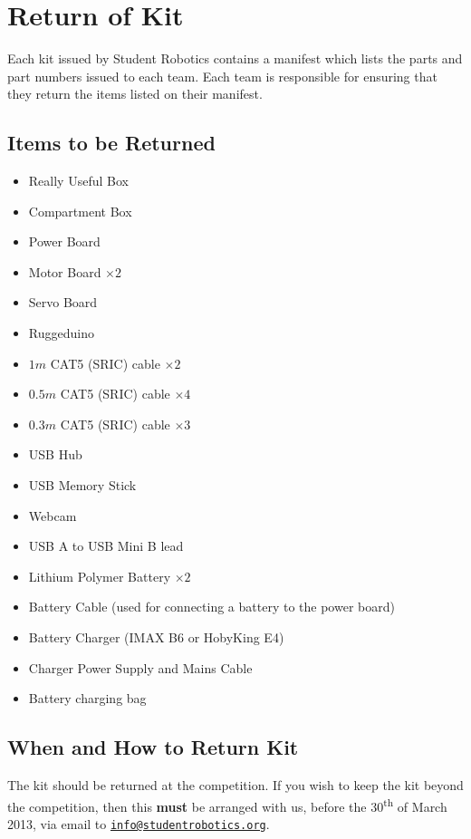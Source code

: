 \section {Return of Kit}
\label{sec:kit-return}

Each kit issued by Student Robotics contains a manifest which lists the parts and part numbers issued to each team.
Each team is responsible for ensuring that they return the items listed on their manifest.

\subsection {Items to be Returned}

\begin{itemize}
 \item Really Useful Box
 \item Compartment Box
\end{itemize}

\begin{itemize}
 \item Power Board
 \item Motor Board $\times 2$
 \item Servo Board
 \item Ruggeduino
 \item $  1m$ CAT5 (SRIC) cable $\times 2$
 \item $0.5m$ CAT5 (SRIC) cable $\times 4$
 \item $0.3m$ CAT5 (SRIC) cable $\times 3$
\end{itemize}

\begin{itemize}
 \item USB Hub
 \item USB Memory Stick
 \item Webcam
 \item USB A to USB Mini B lead
\end{itemize}

\begin{itemize}
 \item Lithium Polymer Battery $\times 2$
 \item Battery Cable (used for connecting a battery to the power board)
 \item Battery Charger (IMAX B6 or HobyKing E4)
 \item Charger Power Supply and Mains Cable
 \item Battery charging bag
\end{itemize}

\subsection {When and How to Return Kit}

The kit should be returned at the competition.
If you wish to keep the kit beyond the competition, then this \textbf{must} be arranged with us,
 before the 30\textsuperscript{th} of March 2013, via email to \href{mailto:info@studentrobotics.org}{\nolinkurl{info@studentrobotics.org}}.
